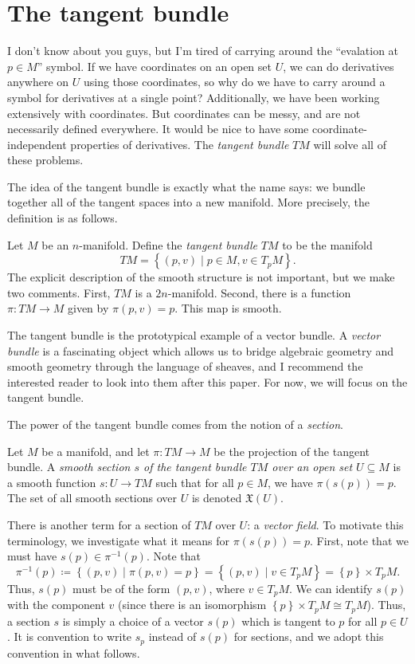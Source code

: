 \section{The tangent bundle}

I don't know about you guys, but I'm tired of carrying around the ``evalation at $p\in M$'' symbol. If we have coordinates on an open set $U$, we can do derivatives anywhere on $U$ using those coordinates, so why do we have to carry around a symbol for derivatives at a single point? Additionally, we have been working extensively with coordinates. But coordinates can be messy, and are not necessarily defined everywhere. It would be nice to have some coordinate-independent properties of derivatives. The \emph{tangent bundle} $TM$ will solve all of these problems.

The idea of the tangent bundle is exactly what the name says: we bundle together all of the tangent spaces into a new manifold. More precisely, the definition is as follows.

\begin{definition}\label{dfn:3-1}
	Let $M$ be an $n$-manifold. Define the \emph{tangent bundle} $TM$ to be the manifold
	\[
		TM = \left\{ (p,v) \mid  p\in M,v\in T_pM \right\} 
	.\]
	The explicit description of the smooth structure is not important, but we make two comments. First, $TM$ is a $2n$-manifold. Second, there is a function $\pi : TM \to M$ given by $\pi (p,v)=p$. This map is smooth.
\end{definition}

The tangent bundle is the prototypical example of a vector bundle. A \emph{vector bundle} is a fascinating object which allows us to bridge algebraic geometry and smooth geometry through the language of sheaves, and I recommend the interested reader to look into them after this paper. For now, we will focus on the tangent bundle.

The power of the tangent bundle comes from the notion of a \emph{section}.

\begin{definition}\label{dfn:3-2}
	Let $M$ be a manifold, and let $\pi : TM \to M$ be the projection of the tangent bundle. A \emph{smooth section $s$ of the tangent bundle $TM$ over an open set $U\subseteq M$} is a smooth function $s : U \to TM$ such that for all $p\in M$, we have $\pi (s(p))=p$. The set of all smooth sections over $U$ is denoted $\mathfrak{X} (U)$.
\end{definition}

There is another term for a section of $TM$ over $U$: a \emph{vector field}. To motivate this terminology, we investigate what it means for $\pi (s(p)) = p$. First, note that we must have $s(p)\in \pi ^{-1} (p)$. Note that
\[
	\pi ^{-1} (p) \coloneqq \left\{ (p,v)\mid \pi (p,v)=p \right\} =\left\{ (p,v)\mid v\in T_pM \right\} =\left\{ p \right\} \times T_pM
.\]
Thus, $s(p)$ must be of the form $(p,v)$, where $v\in T_pM$. We can identify $s(p)$ with the component $v$ (since there is an isomorphism $\left\{ p \right\} \times T_pM\cong T_pM$). Thus, a section $s$ is simply a choice of a vector $s(p)$ which is tangent to $p$ for all $p\in U$. It is convention to write $s_p$ instead of $s(p)$ for sections, and we adopt this convention in what follows.

